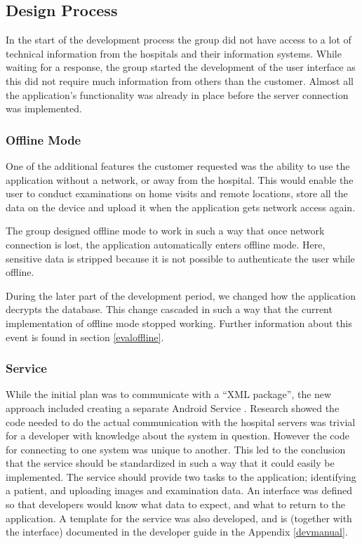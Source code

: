 

\subsection{Design Process}
In the start of the development process the group did not have access to a lot of technical information from the hospitals and their information systems. While waiting for a response, the group started the development of the user interface as this did not require much information from others than the customer. Almost all the application's functionality was already in place before the server connection was implemented.

\subsubsection{Offline Mode}
One of the additional features the customer requested was the ability to use the application without a network, or away from the hospital. This would enable the user to conduct examinations on home visits and remote locations, store all the data on the device and upload it when the application gets network access again.

The group designed offline mode to work in such a way that once network connection is lost, the application automatically enters offline mode. Here, sensitive data is stripped because it is not possible to authenticate the user while offline.

During the later part of the development period, we changed how the application decrypts the database. This change cascaded in such a way that the current implementation of offline mode stopped working. Further information about this event is found in section \ref{evaloffline}.


\subsubsection{Service}
\label{serviceDescription}

While the initial plan was to communicate with a “XML package”, the new approach included creating a separate Android Service \cite{android_service}. Research showed the code needed to do the actual communication with the hospital servers was trivial for a developer with knowledge about the system in question. However the code for connecting to one system was unique to another. This led to the conclusion that the service should be standardized in such a way that it could easily be implemented. The service should provide two tasks to the application; identifying a patient, and uploading images and examination data. An interface was defined so that developers would know what data to expect, and what to return to the application. A template for the service was also developed, and is (together with the interface) documented in the developer guide in the Appendix \ref{devmanual}.

